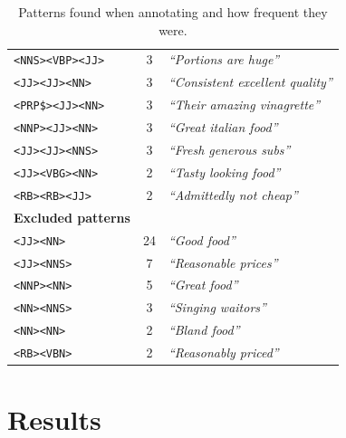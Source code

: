 \documentclass[a4paper,11pt]{kth-mag}
\begin{document}
\begin{table}[t]
\begin{tabular}{| l | c | l |}
    \texttt{<NNS><VBP><JJ>} & 3 & \emph{``Portions are huge''}\\
    \texttt{<JJ><JJ><NN>} & 3 & \emph{``Consistent excellent quality''}\\
    \texttt{<PRP\$><JJ><NN>} & 3 & \emph{``Their amazing vinagrette''}\\
    \texttt{<NNP><JJ><NN>} & 3 & \emph{``Great italian food''}\\
    \texttt{<JJ><JJ><NNS>} & 3 & \emph{``Fresh generous subs''}\\
    \texttt{<JJ><VBG><NN>} & 2 & \emph{``Tasty looking food''}\\
    \texttt{<RB><RB><JJ>} & 2 & \emph{``Admittedly not cheap''}\\
    \hline
    \textbf{Excluded patterns} && \\
    \hline
    \texttt{<JJ><NN>} & 24 & \emph{``Good food''}\\
    \texttt{<JJ><NNS>} & 7 & \emph{``Reasonable prices''}\\
    \texttt{<NNP><NN>} & 5 & \emph{``Great food''}\\
    \texttt{<NN><NNS>} & 3 & \emph{``Singing waitors''}\\
    \texttt{<NN><NN>} & 2 & \emph{``Bland food''}\\
    \texttt{<RB><VBN>} & 2 & \emph{``Reasonably priced''}\\
    \hline
  \end{tabular}
  \caption{Patterns found when annotating and how frequent they were.}
  \label{tab:used_pos}
\end{table}

\clearpage
\section{Results}
\end{document}
